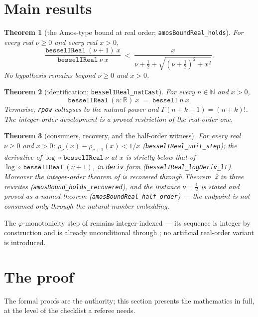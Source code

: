 \documentclass[11pt]{article}
\newtheorem{theorem}{Theorem}[section]
\newcommand{\lean}[1]{\texttt{#1}}
\begin{document}
\section{Main results}\label{sec:results}

\begin{theorem}[the Amos-type bound at real order;
\lean{amosBoundReal\_holds}]\label{thm:main}
For every real $\nu \ge 0$ and every real $x > 0$,
\[
\frac{\lean{besselIReal}\ (\nu{+}1)\ x}{\lean{besselIReal}\ \nu\ x}
\;<\; \frac{x}{\nu+\tfrac12+\sqrt{(\nu+\tfrac12)^2+x^2}} .
\]
No hypothesis remains beyond $\nu \ge 0$ and $x > 0$.
\end{theorem}

\begin{theorem}[identification;
\lean{besselIReal\_natCast}]\label{thm:ident}
For every $n \in \mathbb{N}$ and $x > 0$,
\[
\lean{besselIReal}\ (n:\mathbb{R})\ x \;=\; \lean{besselI}\ n\ x .
\]
Termwise, \lean{rpow} collapses to the natural power and
$\Gamma(n+k+1) = (n+k)!$.  The integer-order development is a proved
restriction of the real-order one.
\end{theorem}

\begin{theorem}[consumers, recovery, and the half-order
witness]\label{thm:consumers}
For every real $\nu \ge 0$ and $x > 0$:
$\rho_\nu(x) - \rho_{\nu+1}(x) < 1/x$
(\lean{besselIReal\_unit\_step}); the derivative of
$\log \circ\, \lean{besselIReal}\ \nu$ at $x$ is strictly below that
of $\log \circ\, \lean{besselIReal}\ (\nu{+}1)$, in \lean{deriv}
form (\lean{besselIReal\_logDeriv\_lt}).  Moreover the integer-order
theorem of \cite{ErikssonC3} is recovered through
Theorem~\ref{thm:ident} in three rewrites
(\lean{amosBound\_holds\_recovered}), and the instance $\nu = \tfrac12$
is stated and proved as a named theorem
(\lean{amosBoundReal\_half\_order}) --- the endpoint is not consumed
only through the natural-number embedding.
\end{theorem}

The $\varphi$-monotonicity step of \cite{ErikssonC2} remains
integer-indexed --- its sequence is integer by construction and is
already unconditional through \cite{ErikssonC3}; no artificial
real-order variant is introduced.

\section{The proof}\label{sec:proof}

The formal proofs are the authority; this section presents the
mathematics in full, at the level of the checklist a referee needs.
\end{document}
